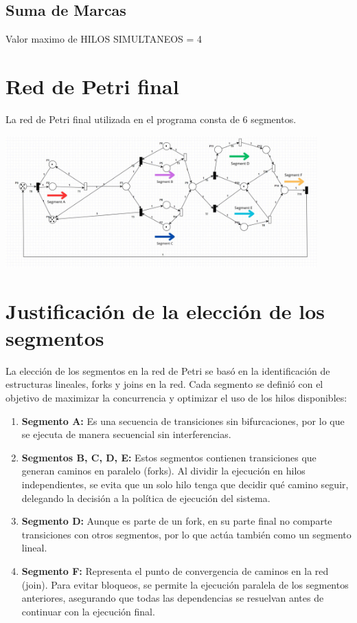 \documentclass[12pt]{article}
\begin{document}
\subsection{ Suma de Marcas}
Valor maximo de HILOS SIMULTANEOS = 4

\section{Red de Petri final}

La red de Petri final utilizada en el programa consta de 6 segmentos.
\begin{center}
    \includegraphics[width=0.9\textwidth]{Petri-Net-Final.jpeg}
\end{center}

\section{Justificación de la elección de los segmentos}

La elección de los segmentos en la red de Petri se basó en la identificación de estructuras lineales, forks y joins en la red. Cada segmento se definió con el objetivo de maximizar la concurrencia y optimizar el uso de los hilos disponibles:

\begin{enumerate}
    \item \textbf{Segmento A:} Es una secuencia de transiciones sin bifurcaciones, por lo que se ejecuta de manera secuencial sin interferencias.
    
    \item \textbf{Segmentos B, C, D, E:} Estos segmentos contienen transiciones que generan caminos en paralelo (forks). Al dividir la ejecución en hilos independientes, se evita que un solo hilo tenga que decidir qué camino seguir, delegando la decisión a la política de ejecución del sistema.
    
    \item \textbf{Segmento D:} Aunque es parte de un fork, en su parte final no comparte transiciones con otros segmentos, por lo que actúa también como un segmento lineal.
    
    \item \textbf{Segmento F:} Representa el punto de convergencia de caminos en la red (join). Para evitar bloqueos, se permite la ejecución paralela de los segmentos anteriores, asegurando que todas las dependencias se resuelvan antes de continuar con la ejecución final.
\end{enumerate}
\end{document}
